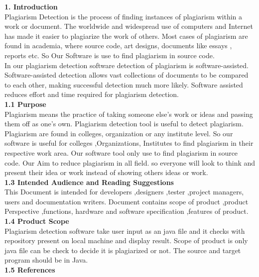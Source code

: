 	\textbf{1.	Introduction}\\
	 Plagiarism Detection is the process of finding  instances of plagiarism within a work or document. The worldwide and widespread use of computers and  Internet has made it easier to plagiarize the work of others. Most cases of plagiarism are found in academia, where source code, art designs, documents like essays , reports etc. So Our Software is use to find plagiarism in source code.\\
	In our plagiarism detection software detection of plagiarism is software-assisted. Software-assisted detection allows vast collections of documents to be compared to each other, making successful detection much more likely. Software assisted reduces effort and time required for plagiarism detection. \\
	\textbf{1.1	Purpose }\\
	Plagiarism means  the practice of taking someone else's work or ideas and passing them off as one's own. Plagiarism detection tool is useful to detect plagiarism. Plagiarism are found in colleges, organization or any institute level. So our software is useful for colleges ,Organizations, Institutes to find plagiarism in their respective work area. Our software tool  only use to find plagiarism in source code. Our Aim to reduce plagiarism in all field. so everyone will look to think and present their idea or work instead of showing others ideas or work.\\
	
	\textbf{1.3	Intended Audience and Reading Suggestions}\\
	This Document is intended for developers ,designers ,tester ,project managers, users and documentation writers. Document contains scope of product ,product Perspective ,functions, hardware and software specification ,features of product.\\
	\textbf{1.4	Product Scope}\\
	Plagiarism detection software take user input as an java file and it checks  with  repository present on local machine and display result. Scope  of product is only java file can be check to decide it  is plagiarized or not. The source  and target program should be in Java.\\
	\textbf{1.5	References}\\
	 
